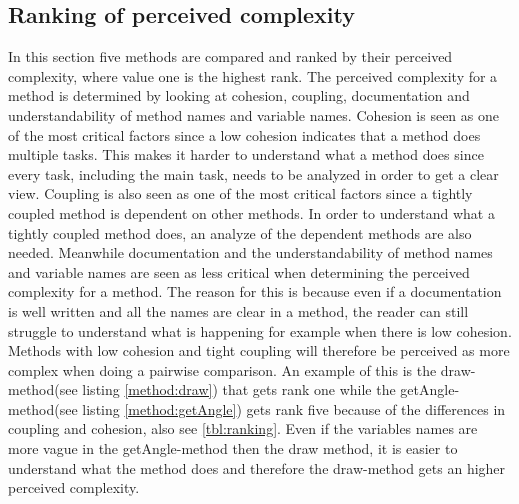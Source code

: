 \documentclass[conference]{IEEEtran}
\newcommand{\lref}[1]{listing \ref{#1}}%
\begin{document}
\subsection{Ranking of perceived complexity}
\label{ssec:ranking}
In this section five methods are compared and ranked by their perceived complexity, where value one is the highest rank. The perceived complexity for a method is determined by looking at cohesion, coupling, documentation and understandability of method names and variable names. Cohesion is seen as one of the most critical factors since a low cohesion indicates that a method does multiple tasks. This makes it harder to understand what a method does since every task, including the main task, needs to be analyzed in order to get a clear view. Coupling is also seen as one of the most critical factors since a tightly coupled method is dependent on other methods. In order to understand what a tightly coupled method does, an analyze of the dependent methods are also needed. Meanwhile documentation and the understandability of method names and variable names are seen as less critical when determining the perceived complexity for a method. The reason for this is because even if a documentation is well written and all the names are clear in a method, the reader can still struggle to understand what is happening for example when there is low cohesion. Methods with low cohesion and tight coupling will therefore be perceived as more complex when doing a pairwise comparison. An example of this is the draw-method(see \lref{method:draw}) that gets rank one while the getAngle-method(see \lref{method:getAngle}) gets rank five because of the differences in coupling and cohesion, also see \cref{tbl:ranking}. Even if the variables names are more vague in the getAngle-method then the draw method, it is easier to understand what the method does and therefore the draw-method gets an higher perceived complexity. 

\end{document}
